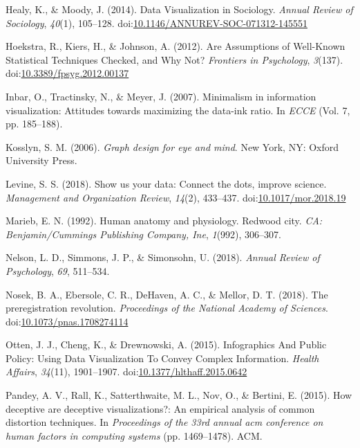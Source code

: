 \documentclass[
  doc]{apa6}
\begin{document}
\leavevmode\hypertarget{ref-Healy2014a}{}%
Healy, K., \& Moody, J. (2014). Data Visualization in Sociology. \emph{Annual Review of Sociology}, \emph{40}(1), 105--128. doi:\href{https://doi.org/10.1146/ANNUREV-SOC-071312-145551}{10.1146/ANNUREV-SOC-071312-145551}

\leavevmode\hypertarget{ref-hoekstra_are_2012}{}%
Hoekstra, R., Kiers, H., \& Johnson, A. (2012). Are Assumptions of Well-Known Statistical Techniques Checked, and Why Not? \emph{Frontiers in Psychology}, \emph{3}(137). doi:\href{https://doi.org/10.3389/fpsyg.2012.00137}{10.3389/fpsyg.2012.00137}

\leavevmode\hypertarget{ref-inbar2007minimalism}{}%
Inbar, O., Tractinsky, N., \& Meyer, J. (2007). Minimalism in information visualization: Attitudes towards maximizing the data-ink ratio. In \emph{ECCE} (Vol. 7, pp. 185--188).

\leavevmode\hypertarget{ref-Kosslyn2006e}{}%
Kosslyn, S. M. (2006). \emph{Graph design for eye and mind}. New York, NY: Oxford University Press.

\leavevmode\hypertarget{ref-Levine2018}{}%
Levine, S. S. (2018). Show us your data: Connect the dots, improve science. \emph{Management and Organization Review}, \emph{14}(2), 433--437. doi:\href{https://doi.org/10.1017/mor.2018.19}{10.1017/mor.2018.19}

\leavevmode\hypertarget{ref-marieb1992human}{}%
Marieb, E. N. (1992). Human anatomy and physiology. Redwood city. \emph{CA: Benjamin/Cummings Publishing Company, Ine}, \emph{1}(992), 306--307.

\leavevmode\hypertarget{ref-Nelson2018a}{}%
Nelson, L. D., Simmons, J. P., \& Simonsohn, U. (2018). \emph{Annual Review of Psychology}, \emph{69}, 511--534.

\leavevmode\hypertarget{ref-Nosek2018}{}%
Nosek, B. A., Ebersole, C. R., DeHaven, A. C., \& Mellor, D. T. (2018). The preregistration revolution. \emph{Proceedings of the National Academy of Sciences}. doi:\href{https://doi.org/10.1073/pnas.1708274114}{10.1073/pnas.1708274114}

\leavevmode\hypertarget{ref-Otten2015}{}%
Otten, J. J., Cheng, K., \& Drewnowski, A. (2015). Infographics And Public Policy: Using Data Visualization To Convey Complex Information. \emph{Health Affairs}, \emph{34}(11), 1901--1907. doi:\href{https://doi.org/10.1377/hlthaff.2015.0642}{10.1377/hlthaff.2015.0642}

\leavevmode\hypertarget{ref-pandey2015deceptive}{}%
Pandey, A. V., Rall, K., Satterthwaite, M. L., Nov, O., \& Bertini, E. (2015). How deceptive are deceptive visualizations?: An empirical analysis of common distortion techniques. In \emph{Proceedings of the 33rd annual acm conference on human factors in computing systems} (pp. 1469--1478). ACM.
\end{document}
